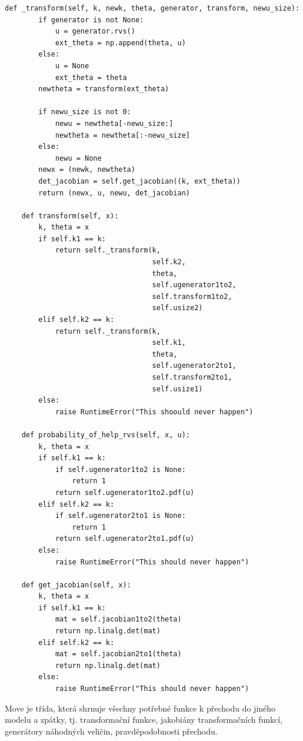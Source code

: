 \documentclass[czech,master,public,dept470,male,cpdeclaration,oneside, python]{diploma}
\begin{document}
\begin{lstlisting}[caption=Move]
    def _transform(self, k, newk, theta, generator, transform, newu_size):
        if generator is not None:
            u = generator.rvs()
            ext_theta = np.append(theta, u)
        else:
            u = None
            ext_theta = theta
        newtheta = transform(ext_theta)

        if newu_size is not 0:
            newu = newtheta[-newu_size:]
            newtheta = newtheta[:-newu_size]
        else:
            newu = None
        newx = (newk, newtheta)
        det_jacobian = self.get_jacobian((k, ext_theta))
        return (newx, u, newu, det_jacobian)

    def transform(self, x):
        k, theta = x
        if self.k1 == k:
            return self._transform(k,
                                   self.k2,
                                   theta,
                                   self.ugenerator1to2,
                                   self.transform1to2,
                                   self.usize2)
        elif self.k2 == k:
            return self._transform(k,
                                   self.k1,
                                   theta,
                                   self.ugenerator2to1,
                                   self.transform2to1,
                                   self.usize1)
        else:
            raise RuntimeError("This shoould never happen")

    def probability_of_help_rvs(self, x, u):
        k, theta = x
        if self.k1 == k:
            if self.ugenerator1to2 is None:
                return 1
            return self.ugenerator1to2.pdf(u)
        elif self.k2 == k:
            if self.ugenerator2to1 is None:
                return 1
            return self.ugenerator2to1.pdf(u)
        else:
            raise RuntimeError("This should never happen")

    def get_jacobian(self, x):
        k, theta = x
        if self.k1 == k:
            mat = self.jacobian1to2(theta)
            return np.linalg.det(mat)
        elif self.k2 == k:
            mat = self.jacobian2to1(theta)
            return np.linalg.det(mat)
        else:
            raise RuntimeError("This should never happen")
\end{lstlisting}

Move je třída, která shrnuje všechny potřebné funkce k přechodu do jiného modelu a zpátky, tj. transformační funkce, jakobiány transformačních funkcí, generátory náhodných veličin, pravděpodobnosti přechodu. 
\end{document}
